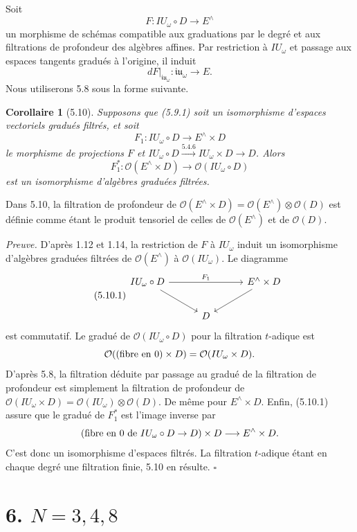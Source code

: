 \documentclass[10pt,a4paper]{article}
\newcommand{\OO}{\mathcal O}
\theoremstyle{deligne}
\newtheorem*{corollary*}{Corollaire}
\newenvironment{proofdel}{\textit{Preuve.}}{\hfill$\square$}
\begin{document}
Soit
\[
F:IU_\omega\circ D\longrightarrow E^\wedge
\]
un morphisme de schémas compatible aux graduations par le degré et aux filtrations de profondeur des algèbres affines. Par restriction à \(IU_\omega\) et passage aux espaces tangents gradués à l'origine, il induit
\[
\tag{5.9.1}
dF|_{\mathfrak{iu}_\omega}:\mathfrak{iu}_\omega\longrightarrow E.
\]
Nous utiliserons 5.8 sous la forme suivante.

\begin{corollary*}[5.10]
Supposons que (5.9.1) soit un isomorphisme d'espaces vectoriels gradués filtrés, et soit
\[
F_1:IU_\omega\circ D\longrightarrow E^\wedge\times D
\]
le morphisme de projections \(F\) et \(IU_\omega\circ D\xrightarrow{5.4.6}IU_\omega\times D\to D\). Alors
\[
F_1^*:\OO(E^\wedge\times D)\longrightarrow\OO(IU_\omega\circ D)
\]
est un isomorphisme d'algèbres graduées filtrées.
\end{corollary*}

Dans 5.10, la filtration de profondeur de \(\OO(E^\wedge\times D)=\OO(E^\wedge)\otimes\OO(D)\) est définie comme étant le produit tensoriel de celles de \(\OO(E^\wedge)\) et de \(\OO(D)\).

\begin{proofdel}
D'après 1.12 et 1.14, la restriction de \(F\) à \(IU_\omega\) induit un isomorphisme d'algèbres graduées filtrées de \(\OO(E^\wedge)\) à \(\OO(IU_\omega)\). Le diagramme
\[
\tag{5.10.1}
\begin{tikzcd}[column sep=3.0em,row sep=2.0em]
IU_\omega\circ D \arrow[rr,"F_1"] \arrow[dr] &&
E^\wedge\times D \arrow[dl]\\
& D &
\end{tikzcd}
\]
est commutatif. Le gradué de \(\OO(IU_\omega\circ D)\) pour la filtration \(t\)-adique est
\[
\OO((\hbox{fibre en }0)\times D)=\OO(IU_\omega\times D).
\]
D'après 5.8, la filtration déduite par passage au gradué de la filtration de profondeur est simplement la filtration de profondeur de \(\OO(IU_\omega\times D)=\OO(IU_\omega)\otimes\OO(D)\). De même pour \(E^\wedge\times D\). Enfin, (5.10.1) assure que le gradué de \(F_1^*\) est l'image inverse par
\[
(\hbox{fibre en }0\hbox{ de }IU_\omega\circ D\to D)\times D
\longrightarrow E^\wedge\times D.
\]
C'est donc un isomorphisme d'espaces filtrés. La filtration \(t\)-adique étant en chaque degré une filtration finie, 5.10 en résulte.
\end{proofdel}

\section*{6. \(N=3,4,8\)}
\end{document}
